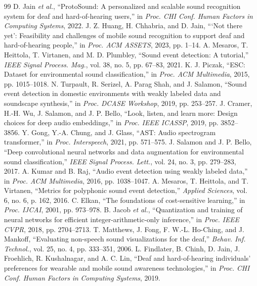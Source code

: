 \documentclass[12pt,a4paper,oneside]{report}
\begin{document}
\begin{thebibliography}{99}
 D. Jain \textit{et al.}, ``ProtoSound: A personalized and scalable sound recognition system for deaf and hard-of-hearing users,'' in \textit{Proc. CHI Conf. Human Factors in Computing Systems}, 2022.
 J. Z. Huang, H. Chhabria, and D. Jain, ```Not there yet': Feasibility and challenges of mobile sound recognition to support deaf and hard-of-hearing people,'' in \textit{Proc. ACM ASSETS}, 2023, pp. 1--14.
 A. Mesaros, T. Heittola, T. Virtanen, and M. D. Plumbley, ``Sound event detection: A tutorial,'' \textit{IEEE Signal Process. Mag.}, vol. 38, no. 5, pp. 67--83, 2021.
 K. J. Piczak, ``ESC: Dataset for environmental sound classification,'' in \textit{Proc. ACM Multimedia}, 2015, pp. 1015--1018.
 N. Turpault, R. Serizel, A. Parag Shah, and J. Salamon, ``Sound event detection in domestic environments with weakly labeled data and soundscape synthesis,'' in \textit{Proc. DCASE Workshop}, 2019, pp. 253--257.
 J. Cramer, H.-H. Wu, J. Salamon, and J. P. Bello, ``Look, listen, and learn more: Design choices for deep audio embeddings,'' in \textit{Proc. IEEE ICASSP}, 2019, pp. 3852--3856.
 Y. Gong, Y.-A. Chung, and J. Glass, ``AST: Audio spectrogram transformer,'' in \textit{Proc. Interspeech}, 2021, pp. 571--575.
 J. Salamon and J. P. Bello, ``Deep convolutional neural networks and data augmentation for environmental sound classification,'' \textit{IEEE Signal Process. Lett.}, vol. 24, no. 3, pp. 279--283, 2017.
 A. Kumar and B. Raj, ``Audio event detection using weakly labeled data,'' in \textit{Proc. ACM Multimedia}, 2016, pp. 1038--1047.
 A. Mesaros, T. Heittola, and T. Virtanen, ``Metrics for polyphonic sound event detection,'' \textit{Applied Sciences}, vol. 6, no. 6, p. 162, 2016.
 C. Elkan, ``The foundations of cost-sensitive learning,'' in \textit{Proc. IJCAI}, 2001, pp. 973--978.
 B. Jacob \textit{et al.}, ``Quantization and training of neural networks for efficient integer-arithmetic-only inference,'' in \textit{Proc. IEEE CVPR}, 2018, pp. 2704--2713.
 T. Matthews, J. Fong, F. W.-L. Ho-Ching, and J. Mankoff, ``Evaluating non-speech sound visualizations for the deaf,'' \textit{Behav. Inf. Technol.}, vol. 25, no. 4, pp. 333--351, 2006.
 L. Findlater, B. Chinh, D. Jain, J. Froehlich, R. Kushalnagar, and A. C. Lin, ``Deaf and hard-of-hearing individuals' preferences for wearable and mobile sound awareness technologies,'' in \textit{Proc. CHI Conf. Human Factors in Computing Systems}, 2019.

\end{thebibliography}
\end{document}
